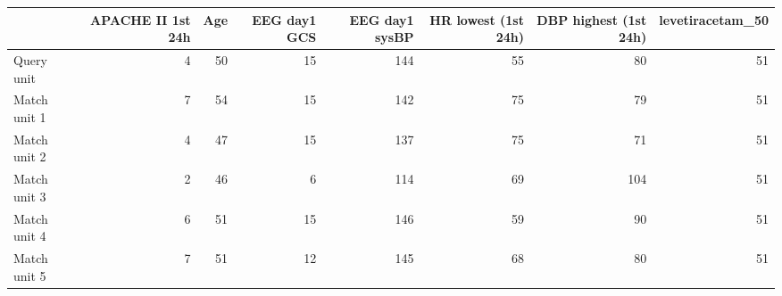 \begin{tabular}{lrrrrrrr}
\toprule
{} &  APACHE II 1st 24h &  Age &  EEG day1 GCS &  EEG day1 sysBP &  HR lowest (1st 24h) &  DBP highest (1st 24h) &  levetiracetam\_50 \\
\midrule
Query unit  &                  4 &   50 &            15 &             144 &                   55 &                     80 &                51 \\
Match unit 1  &                  7 &   54 &            15 &             142 &                   75 &                     79 &                51 \\
Match unit 2  &                  4 &   47 &            15 &             137 &                   75 &                     71 &                51 \\
Match unit 3  &                  2 &   46 &             6 &             114 &                   69 &                    104 &                51 \\
Match unit 4  &                  6 &   51 &            15 &             146 &                   59 &                     90 &                51 \\
Match unit 5 &                  7 &   51 &            12 &             145 &                   68 &                     80 &                51 \\
\bottomrule
\end{tabular}